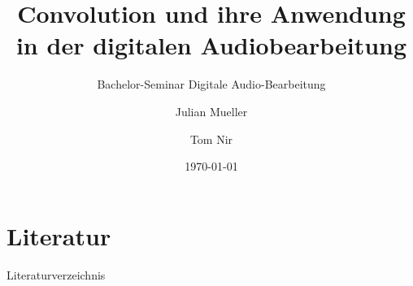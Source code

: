 \documentclass{f4_beamer}
\title{Convolution und ihre Anwendung in der digitalen Audiobearbeitung}
\subtitle{Bachelor-Seminar Digitale Audio-Bearbeitung}
\author{Julian Mueller \and Tom Nir}
\date{\today}
\begin{document}



\section{Literatur}
\begin{frame}[allowframebreaks]{Literaturverzeichnis}
    \printbibliography
\end{frame}
\end{document}
